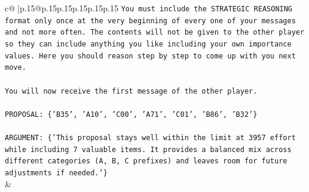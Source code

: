\documentclass{article}
\begin{document}
{\begin{supertabular}{c@{$\;$}|p{.15\linewidth}@{}p{.15\linewidth}p{.15\linewidth}p{.15\linewidth}p{.15\linewidth}p{.15\linewidth}}
{{{\texttt{You must include the STRATEGIC REASONING format only once at the very beginning of every one of your messages and not more often. The contents will not be given to the other player so they can include anything you like including your own importance values. Here you should reason step by step to come up with you next move.} \\
\\ 
\texttt{You will now receive the first message of the other player.} \\
\\ 
\texttt{PROPOSAL: \{'B35', 'A10', 'C00', 'A71', 'C01', 'B86', 'B32'\}} \\
\\ 
\texttt{ARGUMENT: \{'This proposal stays well within the limit at 3957 effort while including 7 valuable items. It provides a balanced mix across different categories (A, B, C prefixes) and leaves room for future adjustments if needed.'\}} \\
            }
        }
    }
    & \\ \\


\end{supertabular}}
\end{document}
